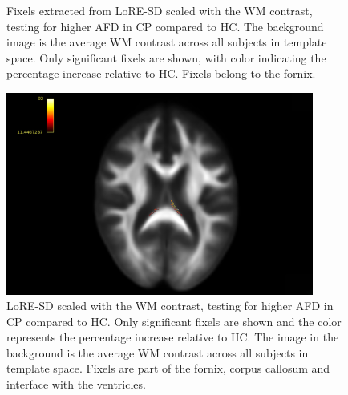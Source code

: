 \begin{figure}[H]
    \centering
    \hfill
    \caption{Fixels extracted from LoRE-SD scaled with the WM contrast, testing for higher AFD in CP compared to HC. The background image is the average WM contrast across all subjects in template space. Only significant fixels are shown, with color indicating the percentage increase relative to HC. Fixels belong to the fornix.}
    \label{fig:fornix4}
\end{figure}



\begin{figure}[h]
  \centering
  \includegraphics[width=0.9\textwidth]{Images/new_wm0002.jpg} %
  \caption{LoRE-SD scaled with the WM contrast, testing for higher AFD in CP compared to HC. Only significant fixels are shown and the color represents the percentage increase relative to HC. The image in the background is the average WM contrast across all subjects in template space. Fixels are part of the fornix, corpus callosum and interface with the ventricles.}
  \label{fig:wm_result}
\end{figure}

